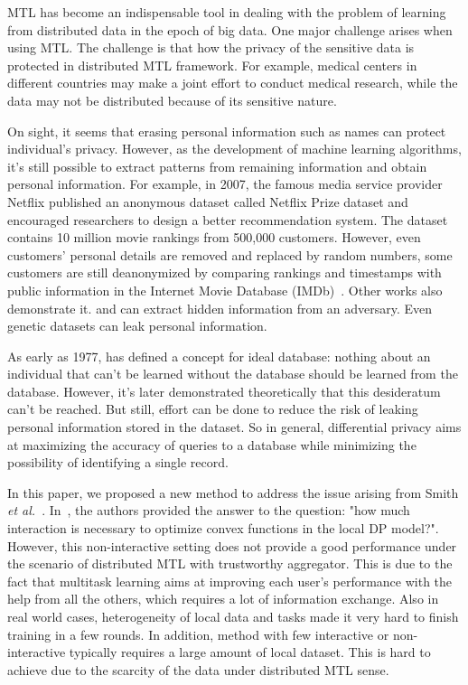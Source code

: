 
MTL has become an indispensable tool in dealing with the problem of learning from distributed data in the epoch of big data. One major challenge arises when using MTL. The challenge is that how the privacy of the sensitive data is protected in distributed MTL framework. For example, medical centers in
different countries may make a joint effort to conduct medical research, while the data may not be distributed because of its sensitive nature.

On sight, it seems that erasing personal information such as names can protect individual's privacy. However, as the development of machine learning algorithms, it's still possible to extract patterns from remaining information and obtain personal information. For example, in 2007, the famous media service provider Netflix published an anonymous dataset called Netflix Prize dataset and encouraged researchers to design a better recommendation system. The dataset contains 10 million movie rankings from 500,000 customers. However, even customers' personal details are removed and replaced by random numbers, some customers are still deanonymized by comparing rankings and timestamps with public information in the Internet Movie Database (IMDb)~\cite{4531148}. Other works also demonstrate it. \cite{doi:10.1111/j.1748-720X.1997.tb01885.x} and \cite{DBLP:journals/corr/abs-0803-0032} can extract hidden information from an adversary. Even genetic datasets can leak personal information\cite{10.1371/journal.pgen.1000167,Wang:2009:LYI:1653662.1653726}.


As early as 1977, \cite{dalenius1977towards} has defined a concept for ideal database: nothing about an individual that can't be learned without the database should be learned from the database. However, it's later demonstrated theoretically that this desideratum can't be reached\cite{Dwork06differentialprivacy}. But still, effort can be done to reduce the risk of leaking personal information stored in the dataset. So in general, differential privacy aims at maximizing the accuracy of queries to a database while minimizing the possibility of identifying a single record.

In this paper, we proposed a new method to address the issue arising from Smith {\it et al.}~\cite{smith2017interaction}. In~\cite{smith2017interaction}, the authors provided the answer to the question: "how much interaction is necessary to optimize convex functions in the local DP model?". However, this non-interactive setting does not provide a good performance under the scenario of distributed MTL with trustworthy aggregator. This is due to the fact that multitask learning aims at improving each user's performance with the help from all the others, which requires a lot of information exchange. Also in real world cases, heterogeneity of local data and tasks made it very hard to finish training in a few rounds. In addition, method with few interactive or non-interactive typically requires a large amount of local dataset. This is hard to achieve due to the scarcity of the data under distributed MTL sense. 

